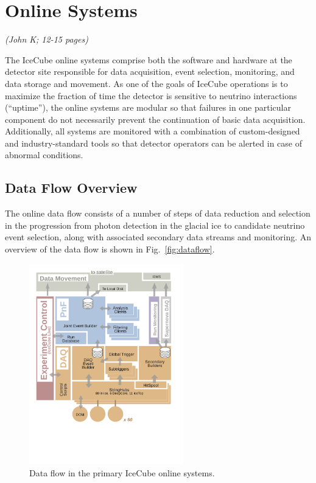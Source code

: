 
\section{\label{sect:online}Online Systems}
\textsl{(John K; 12-15 pages)}

The IceCube online systems comprise both the software and hardware
at the detector site responsible for data acquisition, event selection,
monitoring, and data storage and movement.  As one of the goals of IceCube
operations is to maximize the fraction of time the detector is sensitive
to neutrino interactions (``uptime''), the online systems are modular so
that failures in one
particular component do not necessarily prevent the continuation of basic
data acquisition. Additionally, all systems are monitored with a combination of
custom-designed and industry-standard tools so that detector operators can
be alerted in case of abnormal conditions.

\subsection{\label{sect:online:dataflow}Data Flow Overview}

The online data flow consists of a number of steps of data reduction and
selection in the progression from photon detection in the glacial ice to
candidate neutrino event selection, along with associated secondary data
streams and monitoring.  An overview of the data flow is shown in
Fig.~\ref{fig:dataflow}.

\begin{figure}[!h]
 \centering
 \includegraphics[width=0.6\textwidth]{graphics/online/online_dataflow.pdf}
 \caption{Data flow in the primary IceCube online systems.}
 \label{fig:online_dataflow}
\end{figure}

